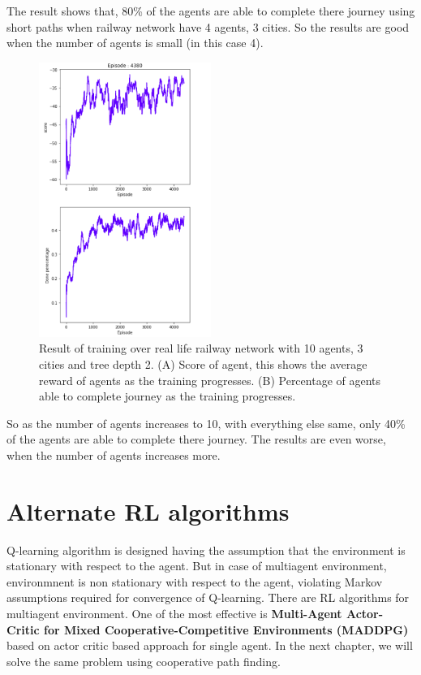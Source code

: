 The result shows that, 80\% of the agents are able to complete there journey using short paths when railway network have 4 agents, 3 cities. 
So the results are good when the number of agents is small (in this case 4).

\begin{figure}[H]
    \centering
    \includegraphics[width=0.5\textwidth]{agent10_city3_multi}
    \caption{Result of training over real life railway network with 10 agents, 3 cities and tree depth 2. 
        (A) Score of agent, this shows the average reward of agents as the training progresses. 
        (B) Percentage of agents able to complete journey as the training progresses. }
    \label{result10}
\end{figure}

So as the number of agents increases to 10, with everything else same, only 40\% of the agents are able to complete there
journey. The results are even worse, when the number of agents increases more.

\section{Alternate RL algorithms}
Q-learning algorithm is designed having the assumption that the environment is stationary with respect to the 
agent. But in case of multiagent environment, environmnent is non stationary with respect to the agent, violating Markov assumptions required for 
convergence of Q-learning. There are RL algorithms for multiagent environment. One of the most effective is 
\textbf{Multi-Agent Actor-Critic for Mixed
Cooperative-Competitive Environments (MADDPG)\cite{ARTICLE:7}} based on actor critic based approach for single agent. 
In the next chapter, we will solve the same problem using cooperative path finding. 